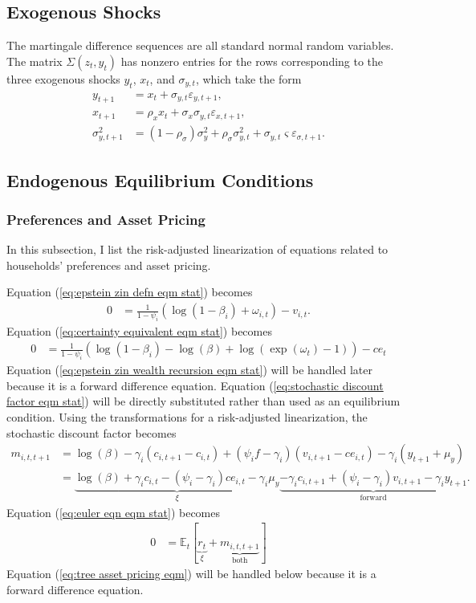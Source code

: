 \documentclass[12 pt, oneside]{article}
\theoremstyle{definition}
\theoremstyle{definition}
\theoremstyle{definition}
\newcommand{\E}{\mathbb{E}}
\begin{document}
\subsection{Exogenous Shocks}
The martingale difference sequences are all standard normal random variables. The matrix $\Sigma(z_t, y_t)$ has nonzero entries for the rows corresponding to the three exogenous shocks $y_t$, $x_t$, and $\sigma_{y, t}$, which take the form
\begin{align}
  y_{t + 1} & = x_t + \sigma_{y, t} \varepsilon_{y, t + 1},\\
  x_{t + 1} & = \rho_x x_t + \sigma_x\sigma_{y, t} \varepsilon_{x, t + 1},\\
  \sigma^2_{y, t + 1} & = (1 - \rho_\sigma)\sigma^2_y + \rho_\sigma \sigma^2_{y, t} + \sigma_{y, t}\varsigma \varepsilon_{\sigma, t + 1}.
\end{align}

\subsection{Endogenous Equilibrium Conditions}

\subsubsection{Preferences and Asset Pricing}
In this subsection, I list the risk-adjusted linearization of equations related to households' preferences and asset pricing.

Equation (\ref{eq:epstein zin defn eqm stat}) becomes
\begin{align*}
  0 & = \frac{1}{1 - \psi_i}(\log(1 - \beta_i) + \omega_{i, t}) - v_{i, t}.
\end{align*}
Equation (\ref{eq:certainty equivalent eqm stat}) becomes
\begin{align*}
  0 & = \frac{1}{1 - \psi_i}(\log(1 - \beta_i) - \log(\beta) + \log(\exp(\omega_t) - 1)) - ce_t
\end{align*}
Equation (\ref{eq:epstein zin wealth recursion eqm stat}) will be handled later because it is a forward difference equation. Equation (\ref{eq:stochastic discount factor eqm stat}) will be directly substituted rather than used as an equilibrium condition. Using the transformations for a risk-adjusted linearization, the stochastic discount factor becomes
\begin{align*}
  m_{i, t, t + 1} & = \log(\beta)  - \gamma_i (c_{i, t + 1} - c_{i, t}) + (\psi_if - \gamma_i)(v_{i, t + 1} - ce_{i, t}) - \gamma_i(y_{t + 1} + \mu_y)\\
               & = \underbrace{\log(\beta) + \gamma_i c_{i, t} - (\psi_i - \gamma_i) ce_{i, t} - \gamma_i \mu_y}_{\xi} \underbrace{ - \gamma_i c_{i, t + 1} + (\psi_i - \gamma_i) v_{i, t + 1} - \gamma_i y_{t + 1}}_{\text{forward}}.
\end{align*}
Equation (\ref{eq:euler eqn eqm stat}) becomes
\begin{align*}
  0 & = \E_t\left[\underbrace{r_t}_{\xi} + \underbrace{m_{i, t, t + 1}}_{\text{both}}\right]
\end{align*}
Equation (\ref{eq:tree asset pricing eqm}) will be handled below because it is a forward difference equation.
\end{document}
